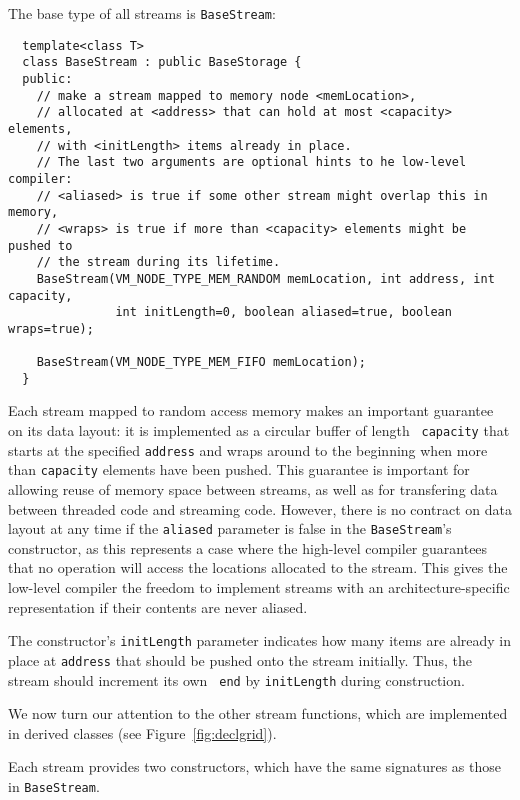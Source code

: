 
The base type of all streams is {\tt BaseStream}:
{\small
\begin{verbatim}
  template<class T>
  class BaseStream : public BaseStorage {
  public:
    // make a stream mapped to memory node <memLocation>, 
    // allocated at <address> that can hold at most <capacity> elements,
    // with <initLength> items already in place.  
    // The last two arguments are optional hints to he low-level compiler:  
    // <aliased> is true if some other stream might overlap this in memory,
    // <wraps> is true if more than <capacity> elements might be pushed to 
    // the stream during its lifetime.
    BaseStream(VM_NODE_TYPE_MEM_RANDOM memLocation, int address, int capacity, 
               int initLength=0, boolean aliased=true, boolean wraps=true);

    BaseStream(VM_NODE_TYPE_MEM_FIFO memLocation);
  }
\end{verbatim}}

Each stream mapped to random access memory makes an important guarantee on its
data layout: it is implemented as a circular buffer of length {\tt
capacity} that starts at the specified {\tt address} and wraps around
to the beginning when more than {\tt capacity} elements have been
pushed.  This guarantee is important for allowing reuse of memory
space between streams, as well as for transfering data between
threaded code and streaming code.  However, there is no contract on
data layout at any time if the {\tt aliased} parameter is false in the
{\tt BaseStream}'s constructor, as this represents a case where the
high-level compiler guarantees that no operation will access the
locations allocated to the stream.  This gives the low-level compiler
the freedom to implement streams with an architecture-specific
representation if their contents are never aliased.

The constructor's {\tt initLength} parameter indicates how many items
are already in place at {\tt address} that should be pushed onto the
stream initially. Thus, the stream should increment its own {\tt
end} by {\tt initLength} during construction.

\newpage
{}

We now turn our attention to the other stream functions, which are
implemented in derived classes (see Figure~\ref{fig:declgrid}).

 Each stream provides two constructors, which have
the same signatures as those in {\tt BaseStream}.


